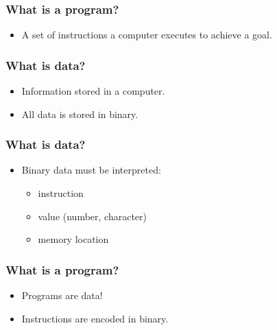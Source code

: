 \documentclass{beamer}
\begin{document}
\begin{frame}
  \frametitle{What is a program?}
  \begin{itemize}
    \item A set of instructions a computer executes to achieve a goal.
  \end{itemize}
\end{frame}

\begin{frame}
  \frametitle{What is data?}
  \begin{itemize}
    \item Information stored in a computer.
    \item All data is stored in binary.
  \end{itemize}
\end{frame}

\begin{frame}
  \frametitle{What is data?}
  \begin{itemize}
    \item Binary data must be interpreted:
	\begin{itemize}
	  \item instruction
	  \item value (number, character)
	  \item memory location
	\end{itemize}
  \end{itemize}
\end{frame}

\begin{frame}
  \frametitle{What is a program?}
  \begin{itemize}
    \item Programs are data!
	\item Instructions are encoded in binary.
  \end{itemize}
\end{frame}
\end{document}
